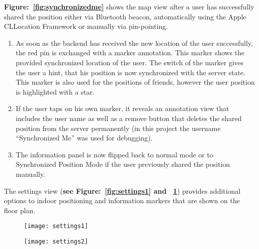\textbf{Figure:~\ref{fig:synchronizedme}} shows the map view after a user has successfully shared the position either via Bluetooth beacon, automatically using the Apple CLLocation Framework or manually via pin-pointing.


\begin{enumerate}
  \item As soon as the backend has received the new location of the user successfully, the red pin is exchanged with a marker annotation. This marker shows the provided synchronized location of the user. The switch of the marker gives the user a hint, that his position is now synchronized with the server state. This marker is also used for the positions of friends, however the user position is highlighted with a star.
  \item If the user taps on his own marker, it reveals an annotation view that includes the user name as well as a remove button that deletes the shared position from the server permanently (in this project the username \enquote{Synchronized Me} was used for debugging).
  \item The information panel is now flipped back to normal mode or to Synchronized Position Mode if the user previously shared the position manually.
\end{enumerate}


The settings view (\textbf{see Figure:~\ref{fig:settings1} and ~\ref{fig:settings2}}) provides additional options to indoor positioning and information markers that are shown on the floor plan.

\begin{figure}
\centering
  \begin{minipage}{.5\textwidth}
    \centering
    \texttt{[image: settings1]}
    \label{fig:settings1}
  \end{minipage}%
  \begin{minipage}{.5\textwidth}
    \centering
    \texttt{[image: settings2]}
    \label{fig:settings2}
  \end{minipage}
\end{figure}

